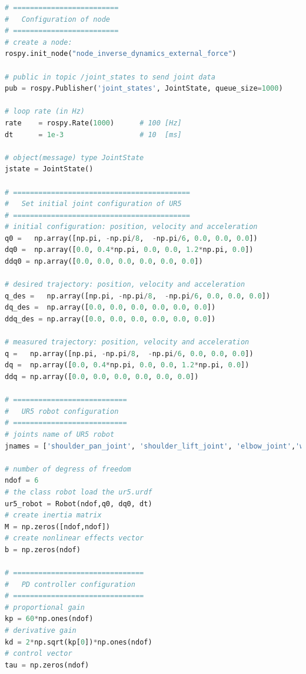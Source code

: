 \vspace{5px}
\begin{lstlisting}[language=Python,caption={Move the second and fifth joint of UR5 robot with the required movement of activity 2.4.}, label={lst:inverse_dynamics_external_force}]
# =========================
#   Configuration of node
# =========================
# create a node: 
rospy.init_node("node_inverse_dynamics_external_force")

# public in topic /joint_states	to send joint data	
pub = rospy.Publisher('joint_states', JointState, queue_size=1000)

# loop rate (in Hz)
rate 	= rospy.Rate(1000)		# 100 [Hz]
dt 		= 1e-3					# 10  [ms]

# object(message) type JointState
jstate = JointState()

# ==========================================
#   Set initial joint configuration of UR5
# ==========================================
# initial configuration: position, velocity and acceleration 
q0 =   np.array([np.pi, -np.pi/8,  -np.pi/6, 0.0, 0.0, 0.0])
dq0 =  np.array([0.0, 0.4*np.pi, 0.0, 0.0, 1.2*np.pi, 0.0]) 
ddq0 = np.array([0.0, 0.0, 0.0, 0.0, 0.0, 0.0]) 

# desired trajectory: position, velocity and acceleration
q_des =   np.array([np.pi, -np.pi/8,  -np.pi/6, 0.0, 0.0, 0.0]) 
dq_des =  np.array([0.0, 0.0, 0.0, 0.0, 0.0, 0.0]) 
ddq_des = np.array([0.0, 0.0, 0.0, 0.0, 0.0, 0.0]) 

# measured trajectory: position, velocity and acceleration
q =   np.array([np.pi, -np.pi/8,  -np.pi/6, 0.0, 0.0, 0.0])
dq =  np.array([0.0, 0.4*np.pi, 0.0, 0.0, 1.2*np.pi, 0.0]) 
ddq = np.array([0.0, 0.0, 0.0, 0.0, 0.0, 0.0]) 

# ===========================
#   UR5 robot configuration
# ===========================
# joints name of UR5 robot
jnames = ['shoulder_pan_joint', 'shoulder_lift_joint', 'elbow_joint','wrist_1_joint', 'wrist_2_joint', 'wrist_3_joint']

# number of degress of freedom
ndof = 6
# the class robot load the ur5.urdf
ur5_robot = Robot(ndof,q0, dq0, dt)
# create inertia matrix 
M = np.zeros([ndof,ndof])
# create nonlinear effects vector
b = np.zeros(ndof)

# ===============================
#   PD controller configuration
# ===============================
# proportional gain
kp = 60*np.ones(ndof)
# derivative gain
kd = 2*np.sqrt(kp[0])*np.ones(ndof)
# control vector
tau = np.zeros(ndof)    


\end{lstlisting}
